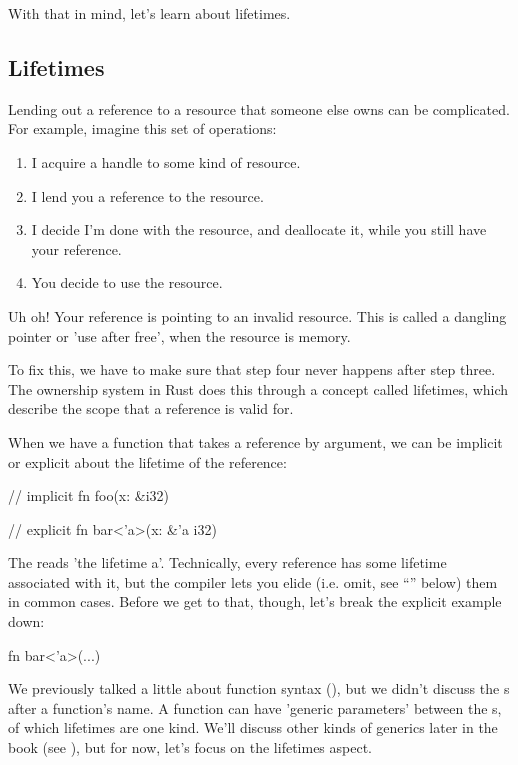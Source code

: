 With that in mind, let's learn about lifetimes.

\subsection*{Lifetimes}

Lending out a reference to a resource that someone else owns can be complicated. For example, imagine this set of operations:

\begin{enumerate}
  \item{I acquire a handle to some kind of resource.}
  \item{I lend you a reference to the resource.}
  \item{I decide I'm done with the resource, and deallocate it, while you still have your reference.}
  \item{You decide to use the resource.}
\end{enumerate}

Uh oh! Your reference is pointing to an invalid resource. This is called a dangling pointer or 'use after free', when the resource 
is memory.

\blank

To fix this, we have to make sure that step four never happens after step three. The ownership system in Rust does this through a 
concept called lifetimes, which describe the scope that a reference is valid for.

\blank

When we have a function that takes a reference by argument, we can be implicit or explicit about the lifetime of the reference:

\begin{rustc}
// implicit
fn foo(x: &i32) {
}

// explicit
fn bar<'a>(x: &'a i32) {
}
\end{rustc}

The  reads 'the lifetime a'. Technically, every reference has some lifetime associated with it, but the compiler lets 
you elide (i.e. omit, see \enquote{} below) them in common cases. Before we get to that, though, let's break the explicit 
example down:

\begin{rustc}
fn bar<'a>(...)
\end{rustc}

We previously talked a little about function syntax (), but we didn't discuss the \code{<>}s after 
a function's name. A function can have 'generic parameters' between the \code{<>}s, of which lifetimes are one kind. We'll discuss 
other kinds of generics later in the book (see ), but for now, let's focus on the lifetimes aspect.

